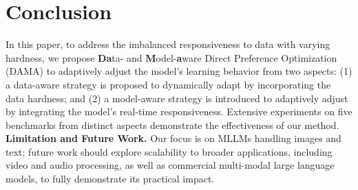 \section{Conclusion}
\label{sec:conclusion}

In this paper, to address the imbalanced responsiveness to data with varying hardness, we propose \textbf{Da}ta- and \textbf{M}odel-\textbf{a}ware Direct Preference Optimization (DAMA) to adaptively adjust the model's learning behavior from two aspects: (1) a data-aware strategy is proposed to dynamically adapt by incorporating the data hardness; and (2) a model-aware strategy is introduced to adaptively adjust by integrating the model's real-time responsiveness. Extensive experiments on five benchmarks from distinct aspects demonstrate the effectiveness of our method.
\newline
\noindent \textbf{Limitation and Future Work.} Our focus is on MLLMs handling images and text; future work should explore scalability to broader applications, including video and audio processing, as well as commercial multi-modal large language models, to fully demonstrate its practical impact.